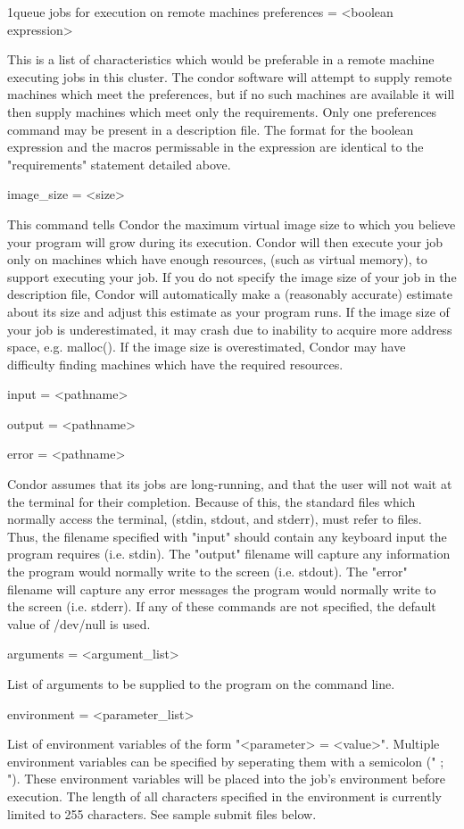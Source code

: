 \begin{ManPage}{}{1}{queue jobs for execution on remote machines}
preferences = <boolean expression> 

This is a list of characteristics which would be preferable in a remote machine executing jobs in this cluster. The condor
software will attempt to supply remote machines which meet the preferences, but if no such machines are available it will
then supply machines which meet only the requirements. Only one preferences command may be present in a description
file. The format for the boolean expression and the macros permissable in the expression are identical to the "requirements"
statement detailed above. 

image\_size = <size> 

This command tells Condor the maximum virtual image size to which you believe your program will grow during its execution.
Condor will then execute your job only on machines which have enough resources, (such as virtual memory), to support
executing your job. If you do not specify the image size of your job in the description file, Condor will automatically make a
(reasonably accurate) estimate about its size and adjust this estimate as your program runs. If the image size of your job is
underestimated, it may crash due to inability to acquire more address space, e.g. malloc(). If the image size is
overestimated, Condor may have difficulty finding machines which have the required resources. 

input = <pathname> 

output = <pathname> 

error = <pathname> 

Condor assumes that its jobs are long-running, and that the user will not wait at the terminal for their completion. Because
of this, the standard files which normally access the terminal, (stdin, stdout, and stderr), must refer to files. Thus, the filename
specified with "input" should contain any keyboard input the program requires (i.e. stdin). The "output" filename will capture
any information the program would normally write to the screen (i.e. stdout). The "error" filename will capture any error
messages the program would normally write to the screen (i.e. stderr). If any of these commands are not specified, the
default value of /dev/null is used. 

arguments = <argument\_list> 

List of arguments to be supplied to the program on the command line. 

environment = <parameter\_list> 

List of environment variables of the form "<parameter> = <value>". Multiple environment variables can be specified by
seperating them with a semicolon (" ; "). These environment variables will be placed into the job's environment before
execution. The length of all characters specified in the environment is currently limited to 255 characters. See sample
submit files below. 


\end{ManPage}
